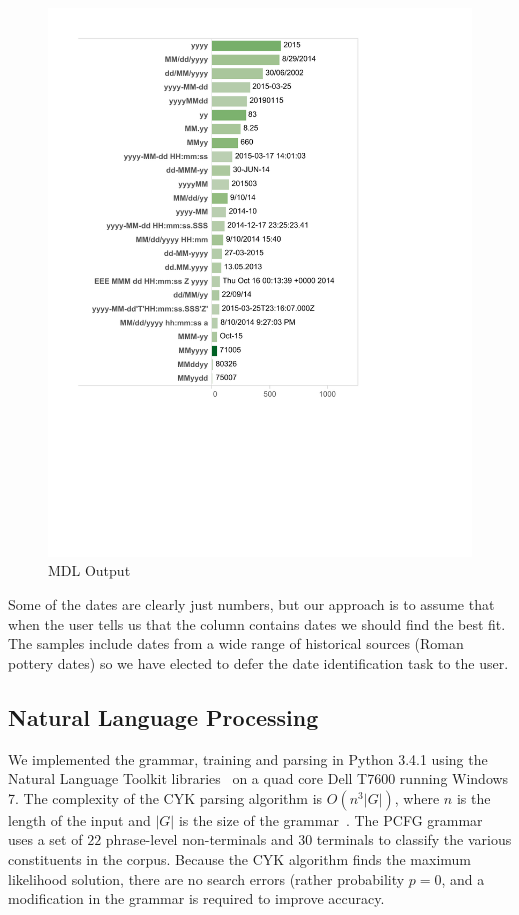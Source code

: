 \begin{figure}[ht]
\centering
\includegraphics[width=\columnwidth]{figures/FigureM3}
\caption{MDL Output}
\label{fig:M3}
\end{figure}

Some of the dates are clearly just numbers, but our approach is to assume that when the user tells us that the column contains dates we should find the best fit. 
The samples include dates from a wide range of historical sources (\eg Roman pottery dates) so we have elected to defer the date identification task to the user.

\subsection{Natural Language Processing}

We implemented the grammar, training and parsing in Python 3.4.1 using the Natural Language Toolkit libraries~\cite{nltk} on a quad core Dell T7600 running Windows 7. The complexity of the CYK parsing algorithm is $O(n^{3}|G|)$, where $n$ is the length of the input and $|G|$ is the size of the grammar~\cite{Younger67}. The PCFG grammar uses a set of $22$ phrase-level non-terminals and $30$ terminals to classify the various constituents in the corpus. Because the CYK algorithm finds the maximum likelihood solution, there are no search errors (rather probability $p = 0$, and a modification in the grammar is required to improve accuracy.

